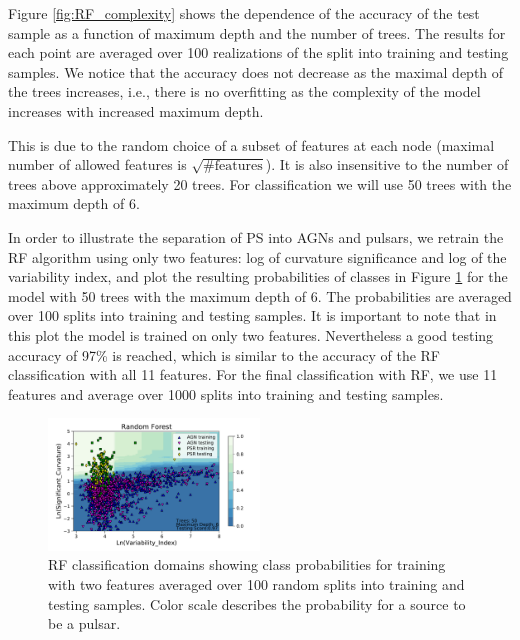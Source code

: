 Figure \ref{fig:RF_complexity} shows the dependence of the accuracy of the test sample as a function of maximum depth and the number of trees. 
The results for each point are averaged over 100 realizations of the split into training and testing samples.
We notice that the accuracy does not decrease as the maximal depth of the trees increases, i.e., there is no overfitting as the complexity of the model increases with increased maximum depth.

This is due to the random choice of a subset of features at each node (maximal number of allowed features is $\sqrt{\text{\# features}}$).
It is also insensitive to the number of trees above approximately 20 trees.
For classification we will use 50 trees with the maximum depth of 6.


In order to illustrate the separation of PS into AGNs and pulsars, we retrain the RF algorithm using only two features: log of curvature significance and log of the variability index, and plot the resulting probabilities of classes in Figure \ref{fig:RF_domains}
for the model with 50 trees with the maximum depth of 6.
The probabilities are averaged over 100 splits into training and testing samples.
It is important to note that in this plot the model is trained on only two features. Nevertheless a good testing accuracy of 97\% is reached, 
which is similar to the accuracy of the RF classification with all 11 features.
For the final classification with RF, we use 11 features and average over 1000 splits into training and testing samples.

\begin{figure}[h]

\includegraphics[width=0.5\textwidth]{plots/classification_domains/rf_50_6_final.pdf}
\caption{RF classification domains showing class probabilities for training with two features
averaged over 100 random splits into training and testing samples.
Color scale describes the probability for a source to be a pulsar.
}
\label{fig:RF_domains}
\end{figure}



